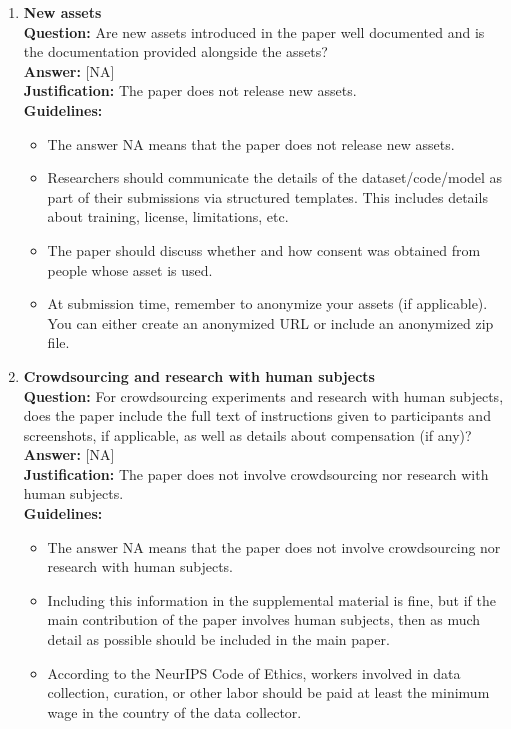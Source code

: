 \begin{enumerate}
\item \textbf{New assets}\\
\textbf{Question:} Are new assets introduced in the paper well documented and is the documentation provided alongside the assets?\\
\textbf{Answer:} [NA]\\
\textbf{Justification:} The paper does not release new assets.\\
\textbf{Guidelines:}
\begin{itemize}
\item The answer NA means that the paper does not release new assets.
\item Researchers should communicate the details of the dataset/code/model as part of their submissions via structured templates. This includes details about training, license, limitations, etc.
\item The paper should discuss whether and how consent was obtained from people whose asset is used.
\item At submission time, remember to anonymize your assets (if applicable). You can either create an anonymized URL or include an anonymized zip file.
\end{itemize}

\item \textbf{Crowdsourcing and research with human subjects}\\
\textbf{Question:} For crowdsourcing experiments and research with human subjects, does the paper include the full text of instructions given to participants and screenshots, if applicable, as well as details about compensation (if any)?\\
\textbf{Answer:} [NA]\\
\textbf{Justification:} The paper does not involve crowdsourcing nor research with human subjects.\\
\textbf{Guidelines:}
\begin{itemize}
\item The answer NA means that the paper does not involve crowdsourcing nor research with human subjects.
\item Including this information in the supplemental material is fine, but if the main contribution of the paper involves human subjects, then as much detail as possible should be included in the main paper.
\item According to the NeurIPS Code of Ethics, workers involved in data collection, curation, or other labor should be paid at least the minimum wage in the country of the data collector.
\end{itemize}


\end{enumerate}
